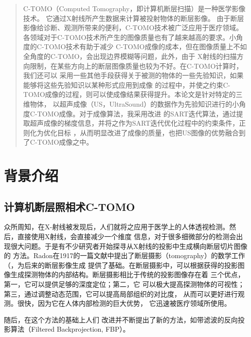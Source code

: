 



\frontmatter
\begin{abstract}
\kaishu{}
C-TOMO（Computed Tomography，即计算机断层扫描）是一种医学影像技术。
它通过X射线所产生数据来计算被投射物体的断层影像。
由于断层影像给诊断、观测所带来的便利，C-TOMO技术被广泛应用于医疗领域。
各领域对于C-TOMO技术所产生的图像质量也有了越来越高的要求。小角度的C-TOMO技术有助于减少
C-TOMO成像的成本，但在图像质量上不如全角度的C-TOMO，会出现边界模糊等问题，此外，由于
X射线的扫描方向限制，在某些方向上的断层图像质量也较为不好。在C-TOMO计算时，我们还可以
采用一些其他手段获得关于被测的物体的一些先验知识，如果能够将这些先验知识以某种形式应用到成像
的过程中，并使之约束C-TOMO成像的过程，则可以使成像结果获得提升。本论文是针对特定的三维物体，
以超声成像（US，UltraSound）的数据作为先验知识进行的小角度C-TOMO成像。对于成像算法，我采用改进
的SART迭代算法，通过提取超声成像的梯度信息，并将之作为SART迭代优化过程中的约束条件，正则化为优化目标
，从而明显改进了成像的质量，也把US图像的优势融合到了C-TOMO成像之中。

\end{abstract}

\begin{englishabstract}
 
\end{englishabstract}
\NJUTtableofcontents
\mainmatter
\chapter{背景介绍}
\section{计算机断层照相术C-TOMO}
众所周知，在X-射线被发现后，人们就将之应用于医学上的人体透视检测。然后，直接使用X射线，会直接减少一个维度
信息，对于很多细微部分的检测会出现很大问题。于是有不少研究者开始探寻从X射线的投影中生成横向断层切片图像的
方法。Radon在1917的一篇文献中提出了断层摄影（tomography）的数学工作（\cite{radon1986}，为后来的断层影像生成
提供了基础。在断层摄影中，可以根据获得的投影图像生成探测物体的内部结构。断层摄影相比于传统的投影图像存在着
三个优点，第一，它可以提供足够的深度定位；第二，它
可以极大提高探测物体的可视性；第三，通过调整动态范围，它可以提高局部组织的对比度，
从而可以更好进行观测。很快，因为它在人体内部检测的巨大优势，
它迅速被医疗领域所使用\cite{dobbins2003digital}。

随后，在这个方法的基础上人们
改进并不断提出了新的方法，如带滤波的反向投影算法（Filtered Backprojection, FBP）\cite{kak1979computerized}。









